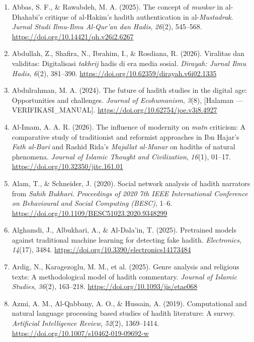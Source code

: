 \sloppy
\raggedright

\begin{enumerate}[leftmargin=1.5cm,itemindent=-1.5cm,label={},itemsep=4pt,parsep=2pt]
    \item Abbas, S. F., \& Rawabdeh, M. A. (2025). The concept of \textit{munkar} in al-Dhahabi's critique of al-Hakim's hadith authentication in al-\textit{Mustadrak}. \textit{Jurnal Studi Ilmu-Ilmu Al-Qur'an dan Hadis}, \textit{26}(2), 545--568. \url{https://doi.org/10.14421/qh.v26i2.6267}
    \item Abdullah, Z., Shafira, N., Ibrahim, I., \& Rosdiana, R. (2026). Viralitas dan validitas: Digitalisasi \textit{takhrij} hadis di era media sosial. \textit{Dirayah: Jurnal Ilmu Hadis}, \textit{6}(2), 381--390. \url{https://doi.org/10.62359/dirayah.v6i02.1335}
    \item Abdulrahman, M. A. (2024). The future of hadith studies in the digital age: Opportunities and challenges. \textit{Journal of Ecohumanism}, \textit{3}(8), [Halaman --- VERIFIKASI\_MANUAL]. \url{https://doi.org/10.62754/joe.v3i8.4927}
    \item Al-Imam, A. A. R. (2026). The influence of modernity on \textit{matn} criticism: A comparative study of traditionist and reformist approaches in Ibn Hajar's \textit{Fath al-Bari} and Rashid Rida's \textit{Majallat al-Manar} on hadiths of natural phenomena. \textit{Journal of Islamic Thought and Civilization}, \textit{16}(1), 01--17. \url{https://doi.org/10.32350/jitc.161.01}
    \item Alam, T., \& Schneider, J. (2020). Social network analysis of hadith narrators from \textit{Sahih Bukhari}. \textit{Proceedings of 2020 7th IEEE International Conference on Behavioural and Social Computing (BESC)}, 1--6. \url{https://doi.org/10.1109/BESC51023.2020.9348299}
    \item Alghamdi, J., Albukhari, A., \& Al-Dala'in, T. (2025). Pretrained models against traditional machine learning for detecting fake hadith. \textit{Electronics}, \textit{14}(17), 3484. \url{https://doi.org/10.3390/electronics14173484}
    \item Ardig, N., Karagezoglu, M. M., et al. (2025). Genre analysis and religious texts: A methodological model of hadith commentary. \textit{Journal of Islamic Studies}, \textit{36}(2), 163--218. \url{https://doi.org/10.1093/jis/etae068}
    \item Azmi, A. M., Al-Qabbany, A. O., \& Hussain, A. (2019). Computational and natural language processing based studies of hadith literature: A survey. \textit{Artificial Intelligence Review}, \textit{52}(2), 1369--1414. \url{https://doi.org/10.1007/s10462-019-09692-w}

\end{enumerate}
